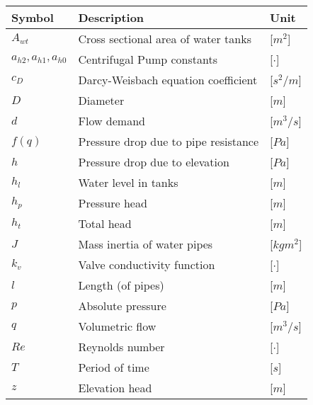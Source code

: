 \begin{tabular}{l l l} 
	\textbf{Symbol}		&	\textbf{Description}								& \hspace{25mm}\textbf{Unit}	\\\hline

	$A_{wt}$ 			&	Cross sectional area of water tanks	 				& \hspace{25mm}[$m^2$]\\
	$a_{h2},a_{h1},a_{h0}$ &	Centrifugal Pump constants	 								& \hspace{25mm}[$\cdot$]\\
	$c_D$				&	Darcy-Weisbach equation coefficient	 				& \hspace{25mm}[$s^2/m$]\\
	$D$					&	Diameter 											& \hspace{25mm}[$m$]\\
	$d$					&	Flow demand	 										& \hspace{25mm}[$m^3/s$]\\
	$f(q)$				&	Pressure drop due to pipe resistance				& \hspace{25mm}[$Pa$]\\
	$h$					&	Pressure drop due to elevation					    & \hspace{25mm}[$Pa$]\\
	$h_{l}$				&	Water level in tanks							    & \hspace{25mm}[$m$]\\
	$h_p$				&	Pressure head									    & \hspace{25mm}[$m$]\\
	$h_t$				&	Total head									        & \hspace{25mm}[$m$]\\
	$J$					&	Mass inertia of water pipes							& \hspace{25mm}[$kgm^2$]\\
	$k_v$				&	Valve conductivity function							& \hspace{25mm}[$\cdot$]\\
	$l$					&	Length (of pipes)									& \hspace{25mm}[$m$]\\
	$p$					&	Absolute pressure									& \hspace{25mm}[$Pa$]\\
	$q$					&	Volumetric flow									    & \hspace{25mm}[$m^3/s$]\\
	$Re$				&	Reynolds number								        & \hspace{25mm}[$\cdot$]\\
	$T$					&	Period of time								        & \hspace{25mm}[$s$]\\
	$z$					&	Elevation head									    & \hspace{25mm}[$m$]\\


\end{tabular}
